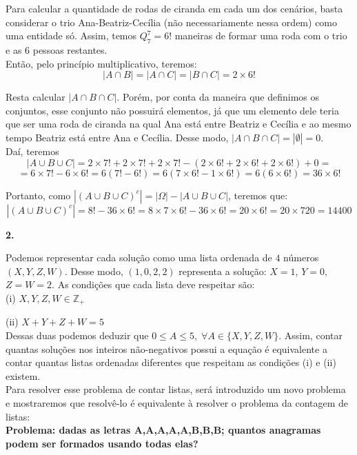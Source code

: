 \documentclass[12pt, a4paper]{article}
\begin{document}
Para calcular a quantidade de rodas de ciranda em cada um dos cenários, basta considerar o trio Ana-Beatriz-Cecília (não necessariamente nessa ordem) como uma entidade só. Assim, temos \(Q^{7}_{7} = 6!\) maneiras de formar uma roda com o trio e as \(6\) pessoas restantes. \\

Então, pelo princípio multiplicativo, teremos: \[|A \cap B| = |A \cap C| = |B \cap C| = 2 \times 6!\] 

Resta calcular \(|A \cap B \cap C|\). Porém, por conta da maneira que definimos os conjuntos, esse conjunto não possuirá elementos, já que um elemento dele teria que ser uma roda de ciranda na qual Ana está entre Beatriz e Cecília e ao mesmo tempo Beatriz está entre Ana e Cecília. Desse modo, \(|A \cap B \cap C| = |\emptyset| = 0\). \\

Daí, teremos \[|A \cup B  \cup C| = 2 \times 7! + 2 \times 7! + 2 \times 7! - (2 \times 6! + 2 \times 6! + 2 \times 6!) + 0 =\] \[= 6 \times 7! - 6\times 6! = 6(7! - 6!) = 6(7 \times 6! -  1\times 6!) = 6(6 \times 6!) = 36 \times 6! \]

Portanto, como \( |(A \cup B  \cup C)^c| = |\Omega| - |A\cup B \cup C|\), teremos que: \[ |(A \cup B  \cup C)^c| = 8! - 36 \times 6! = 8 \times 7 \times 6! - 36 \times 6! = 20 \times 6! = 20 \times 720 = 14400\] 

\textbf{2.}

Podemos representar cada solução como uma lista ordenada de \(4\) números \((X, Y, Z, W)\). Desse modo, \((1,0,2,2)\) representa a solução: \(X = 1\), \(Y=0\), \(Z = W = 2\). As condições que cada lista deve respeitar são: \\ 

(i) \(X, Y, Z, W \in \mathbb{Z}_+\)

(ii) \(X+Y+Z+W = 5\)\\

Dessas duas podemos deduzir que \(0 \leq A  \leq 5, \; \forall A \in \{X,Y,Z,W\}\). Assim, contar quantas soluções nos inteiros não-negativos possui a equação é equivalente a contar quantas listas ordenadas diferentes que respeitam as condições (i) e (ii) existem.\\

Para resolver esse problema de contar listas, será introduzido um novo problema e mostraremos que resolvê-lo é equivalente à resolver o problema da contagem de listas: \\

\textbf{Problema: dadas as letras A,A,A,A,A,B,B,B; quantos anagramas podem ser formados usando todas elas?} \\
\end{document}
